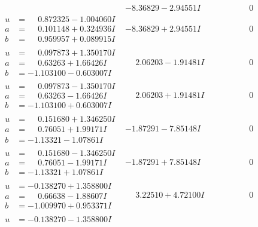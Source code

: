\documentclass[1p]{elsarticle_modified}
\theoremstyle{definition}
\begin{document}
$$\begin{array}{c|c|c}
 & -8.36829 - 2.94551 I & \phantom{-0.000000 } 0 \\ \hline\begin{aligned}
u &= \phantom{-}0.872325 - 1.004060 I \\
a &= \phantom{-}0.101148 + 0.324936 I \\
b &= \phantom{-}0.959957 + 0.089915 I\end{aligned}
 & -8.36829 + 2.94551 I & \phantom{-0.000000 } 0 \\ \hline\begin{aligned}
u &= \phantom{-}0.097873 + 1.350170 I \\
a &= \phantom{-}0.63263 + 1.66426 I \\
b &= -1.103100 - 0.603007 I\end{aligned}
 & \phantom{-}2.06203 - 1.91481 I & \phantom{-0.000000 } 0 \\ \hline\begin{aligned}
u &= \phantom{-}0.097873 - 1.350170 I \\
a &= \phantom{-}0.63263 - 1.66426 I \\
b &= -1.103100 + 0.603007 I\end{aligned}
 & \phantom{-}2.06203 + 1.91481 I & \phantom{-0.000000 } 0 \\ \hline\begin{aligned}
u &= \phantom{-}0.151680 + 1.346250 I \\
a &= \phantom{-}0.76051 + 1.99171 I \\
b &= -1.13321 - 1.07861 I\end{aligned}
 & -1.87291 - 7.85148 I & \phantom{-0.000000 } 0 \\ \hline\begin{aligned}
u &= \phantom{-}0.151680 - 1.346250 I \\
a &= \phantom{-}0.76051 - 1.99171 I \\
b &= -1.13321 + 1.07861 I\end{aligned}
 & -1.87291 + 7.85148 I & \phantom{-0.000000 } 0 \\ \hline\begin{aligned}
u &= -0.138270 + 1.358800 I \\
a &= \phantom{-}0.66638 - 1.88607 I \\
b &= -1.009970 + 0.953371 I\end{aligned}
 & \phantom{-}3.22510 + 4.72100 I & \phantom{-0.000000 } 0 \\ \hline\begin{aligned}
u &= -0.138270 - 1.358800 I \\

\end{aligned}
\end{array}$$
\end{document}
